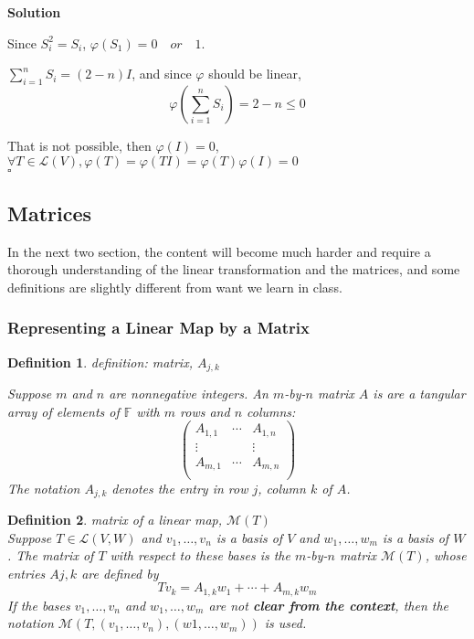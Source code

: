 \documentclass{article}
\newtheorem{definition}{Definition}[subsection]
\newenvironment{solution}{%
{
    \textbf{Solution\\}
    }
}{
  \hfill $\square$ 
  \par\bigskip 
}
\newcommand{\FF}{\mathbb{F}}
\begin{document}
\begin{CJK}{UTF8}{gkai}
\begin{solution}
Since $S_i^2 = S_i$, $\varphi(S_1) = 0\quad or\quad 1$.

$\sum_{i = 1}^n S_i= (2 - n)I$, and since $\varphi$ should be linear,
\[\varphi(\sum_{i = 1}^n S_i) = 2- n \leq 0\]

That is not possible, then $\varphi(I) = 0$,$\forall T \in \mathcal{L}(V) , \varphi(T) = \varphi(TI) = \varphi(T) \varphi(I) = 0$\\
\end{solution}

\subsection{Matrices}
In the next two section, the content will become much harder and require a thorough understanding of the linear transformation and the matrices, and some definitions are slightly different from want we learn in class.\\

\subsubsection{Representing a Linear Map by a Matrix}

\begin{definition}
    definition: matrix, $A_{j,k}$

    Suppose $m$ and $n$ are nonnegative integers. An $m$-by-$n$ matrix $A$ is are a tangular array of elements of $\FF$ with $m$ rows and $n$ columns:
    \[\begin{pmatrix}
        A_{1,1}&\cdots&A_{1,n}\\
        \vdots&&\vdots\\
        A_{m,1}&\cdots&A_{m,n}\\
    \end{pmatrix}\]
    The notation $A_{j,k}$ denotes the entry in row $j$, column $k$ of $A$.
\end{definition}

\begin{definition}matrix of a linear map, $\mathcal{M}(T)$\\
    
    Suppose $T \in \mathcal{L}(V,W)$ and $v_1,\ldots,v_n$ is a basis of $V$ and $w_1,\ldots,w_m$ is a basis of $W$. The matrix of $T$ with respect to these bases is the $m$-by-$n$ matrix $\mathcal{M}(T)$, whose entries $A{j,k}$ are defined by
    \[Tv_k = A_{1,k}w_1 +\cdots+A_{m,k}w_m\]
    If the bases $v_1,\ldots,v_n$ and $w_1,\ldots,w_m$ are not \textbf{clear from the context}, then the notation $\mathcal{M}(T,(v_1,\ldots,v_n),(w1,\ldots,w_m))$ is used.
 

\end{definition}
\end{CJK}
\end{document}

